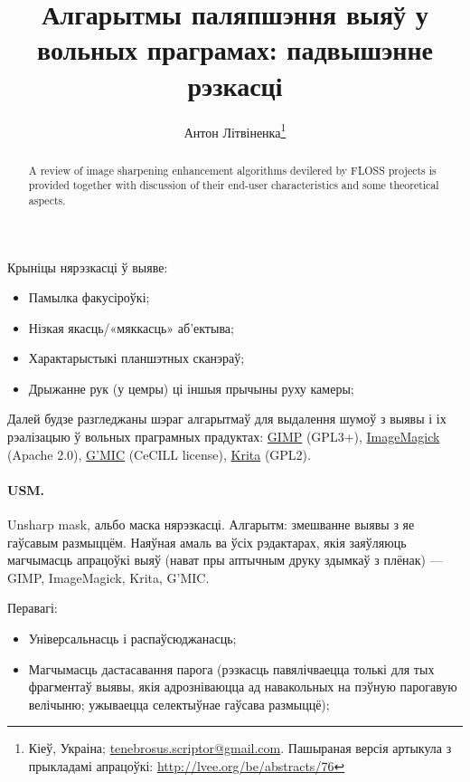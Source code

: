 \documentclass[10pt, a5paper]{article}
\begin{document}
\title{Алгарытмы паляпшэння выяў у вольных праграмах: падвышэнне рэзкасці}%

\author{Антон Літвіненка\footnote{Кіеў, Украіна; \url{tenebrosus.scriptor@gmail.com}. Пашыраная версія артыкула з прыкладамі апрацоўкі: \url{http://lvee.org/be/abstracts/76}}}
\maketitle

\begin{abstract}
A review of image sharpening enhancement algorithms devilered by FLOSS projects is provided together with discussion of their end-user characteristics and some theoretical aspects.
\end{abstract}

Крыніцы нярэзкасці ў выяве:
\begin{itemize}
  \item Памылка факусіроўкі;
  \item Нізкая якасць/«мяккасць» аб’ектыва;
  \item Характарыстыкі планшэтных сканэраў;
  \item Дрыжанне рук (у цемры) ці іншыя прычыны руху камеры;
\end{itemize}

Далей будзе разгледжаны шэраг алгарытмаў для выдалення шумоў з выявы і іх рэалізацыю ў вольных праграмных прадуктах: \href{http://www.gimp.org/}{GIMP} (GPL3+), \href{http://www.imagemagick.org/}{ImageMagick} (Apache 2.0), \href{http://gmic.sourceforge.net/}{G’MIC} (CeCILL license), \href{http://krita.org/}{Krita} (GPL2).

\paragraph*{USM.} Unsharp mask, альбо маска нярэзкасці. Алгарытм: змеш\-ванне выявы з яе гаўсавым размыццём. Наяўная амаль ва ўсіх рэдактарах, якія заяўляюць магчымасць апрацоўкі выяў (нават пры аптычным друку здымкаў з плёнак) — {GIMP}, {ImageMagick}, {Krita}, {G'MIC}.

Перавагі:

\begin{itemize}
  \item Універсальнасць і распаўсюджанасць;
  \item Магчымасць дастасавання парога (рэзкасць павялічваецца \linebreak толькі для тых фрагментаў выявы, якія адрозніваюцца ад навакольных на пэўную парогавую велічыню; ужываецца селектыўнае гаўсава размыццё);
\end{itemize}
\end{document}
